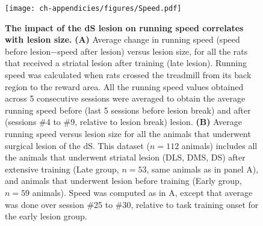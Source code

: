 \begin{figure}[bth!]
  \begin{center}
    \texttt{[image: ch-appendicies/figures/Speed.pdf]}
    \caption[Speed-Lesion Size Correlation]
    {\textbf{The impact of the dS lesion on running speed correlates with lesion size.}
    \textbf{(A)} Average change in running speed (speed before lesion$-$speed after lesion) versus lesion size, for all the rats that received a striatal lesion after training (late lesion).
    Running speed was calculated when rats crossed the treadmill from its back region to the reward area.
    All the running speed values obtained across 5 consecutive sessions were averaged to obtain the average running speed before (last 5 sessions before lesion break) and after (sessions \#4 to \#9, relative to lesion break) lesion. 
    \textbf{(B)} Average running speed versus lesion size for all the animals that underwent surgical lesion of the dS.
    This dataset ($n=112$ animals) includes all the animals that underwent striatal lesion (DLS, DMS, DS) after extensive training (Late group, $n=53$, same animals as in panel A), and animals that underwent lesion before training (Early group, $n=59$ animals).
    Speed was computed as in A, except that average was done over session \#25 to \#30, relative to task training onset for the early lesion group.
    }
    \label{fig:appendix:spd}
  \end{center}
\end{figure}